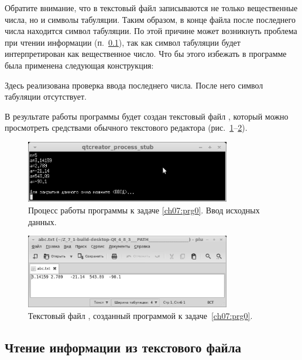 Обратите внимание, что в текстовый файл записываются не только вещественные числа, но и символы табуляции. Таким
образом, в конце файла после последнего числа находится символ табуляции. По этой причине может возникнуть проблема при
чтении информации (п.~\ref{ch07:2.2}), так как символ табуляции будет интерпретирован как вещественное число. Что бы этого
избежать в программе была применена следующая конструкция:


Здесь реализована проверка ввода последнего числа. После него символ табуляции отсутствует.

В результате работы программы будет создан текстовый файл , который можно просмотреть
средствами обычного текстового редактора (рис.~\ref{ch07:refDrawing0}--\ref{ch07:refDrawing1}).
\begin{figure}[htb]
\begin{center}
\includegraphics[width=0.8\textwidth]{img/ris_7_1}
\caption{Процесс работы программы к задаче \ref{ch07:prg0}. Ввод исходных данных.}
\label{ch07:refDrawing0}
\end{center}
\end{figure}
\begin{figure}[htb]
\begin{center}
\includegraphics[width=0.8\textwidth]{img/ris_7_2}
\caption{Текстовый файл , созданный программой к задаче~\ref{ch07:prg0}.}
\label{ch07:refDrawing1}
\end{center}
\end{figure}

\subsection[Чтение информации из текстового файла]{Чтение информации из текстового файла}\label{ch07:2.2}

